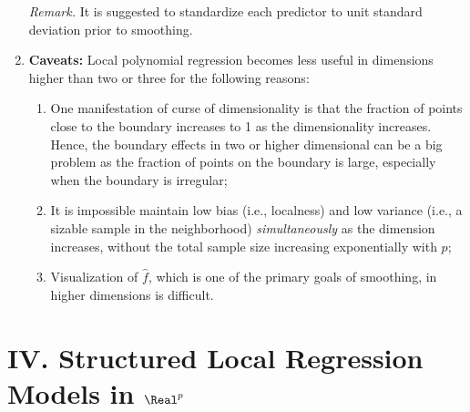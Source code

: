 \documentclass[12pt]{article}
\begin{document}
\begin{enumerate}[label=\textbf{\arabic*.}]
	\textit{Remark.} It is suggested to standardize each predictor to unit standard deviation prior to smoothing. 
	
	\item \textbf{Caveats:} Local polynomial regression becomes less useful in dimensions higher than two or three for the following reasons: 
	\begin{enumerate}
	
		\item One manifestation of curse of dimensionality is that the fraction of points close to the boundary increases to 1 as the dimensionality increases. Hence, the boundary effects in two or higher dimensional can be a big problem as the fraction of points on the boundary is large, especially when the boundary is irregular; 
		
		\item It is impossible maintain low bias (i.e., localness) and low variance (i.e., a sizable sample in the neighborhood) \emph{simultaneously} as the dimension increases, without the total sample size increasing exponentially with $p$; 
		
		\item Visualization of $\hat{f}$, which is one of the primary goals of smoothing, in higher dimensions is difficult. 

	\end{enumerate}

\end{enumerate}


\section*{IV. Structured Local Regression Models in $\Real^p$}
\end{document}
